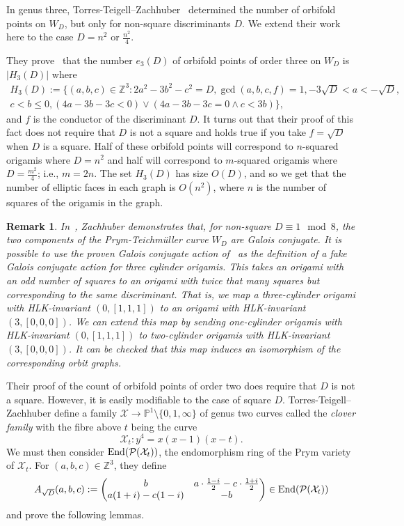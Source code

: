 \documentclass[a4paper,11pt]{amsart}
\numberwithin{equation}{section}
\numberwithin{figure}{section}
\numberwithin{table}{section}
\newtheorem{remark}[theorem]{Remark}
\newcommand{\teichmuller}{Teichm{\"u}ller }
\newcommand{\Z}{\mathbb{Z}}
\DeclareMathOperator{\End}{{\rm{End}}}
\begin{document}
In genus three, Torres-Teigell--Zachhuber~\cite{TTZ18} determined the number of orbifold points on $W_{D}$, but only for non-square discriminants $D$. We extend their work here to the case $D = n^2$ or $\frac{n^2}{4}$.

They prove~\cite[Section 5.2]{TTZ18} that the number $e_{3}(D)$ of orbifold points of order three on $W_{D}$ is $|H_{3}(D)|$ where
\begin{multline*}
    H_{3}(D) := \{(a,b,c)\in\Z^{3}:2a^2-3b^2-c^2=D,\gcd(a,b,c,f) = 1, -3\sqrt{D}<a<-\sqrt{D}, \\
    c< b\leq 0, (4a-3b-3c<0)\vee(4a-3b-3c = 0 \wedge c<3b) \},
\end{multline*}
and $f$ is the conductor of the discriminant $D$. It turns out that their proof of this fact does not require that $D$ is not a square and holds true if you take $f = \sqrt{D}$ when $D$ is a square. Half of these orbifold points will correspond to $n$-squared origamis where $D = n^{2}$ and half will correspond to $m$-squared origamis where $D = \frac{m^{2}}{4}$; i.e., $m = 2n$. The set $H_{3}(D)$ has size $O(D)$, and so we get that the number of elliptic faces in each graph is $O(n^2)$, where $n$ is the number of squares of the origamis in the graph.

\begin{remark}
    In~\cite{Zac}, Zachhuber demonstrates that, for non-square $D\equiv 1\!\!\mod 8$, the two components of the Prym-\teichmuller curve $W_{D}$ are Galois conjugate. It is possible to use the proven Galois conjugate action of~\cite[Proposition 4.7]{Zac} as the definition of a fake Galois conjugate action for three cylinder origamis. This takes an origami with an odd number of squares to an origami with twice that many squares but corresponding to the same discriminant. That is, we map a three-cylinder origami with HLK-invariant $(0,[1,1,1])$ to an origami with HLK-invariant $(3,[0,0,0])$. We can extend this map by sending one-cylinder origamis with HLK-invariant $(0,[1,1,1])$ to two-cylinder origamis with HLK-invariant $(3,[0,0,0])$. It can be checked that this map induces an isomorphism of the corresponding orbit graphs.
\end{remark}

Their proof of the count of orbifold points of order two does require that $D$ is not a square. However, it is easily modifiable to the case of square $D$. Torres-Teigell--Zachhuber define a family $\mathcal{X}\to\mathbb{P}^{1}\setminus\{0,1,\infty\}$ of genus two curves called the \textit{clover family} with the fibre above $t$ being the curve
\[\mathcal{X}_{t}: y^4 = x(x-1)(x-t).\]
We must then consider $\End(\mathcal{P}(\mathcal{X}_{t}))$, the endomorphism ring of the Prym variety of $\mathcal{X}_{t}$. For $(a,b,c)\in\Z^{3}$, they define
\[A_{\sqrt{D}}(a,b,c):=\begin{pmatrix}
    b & a\cdot\frac{1-i}{2}-c\cdot\frac{1+i}{2} \\
    a(1+i)-c(1-i) & -b
\end{pmatrix}\in\End(\mathcal{P}(\mathcal{X}_{t}))\]
and prove the following lemmas.
\end{document}
